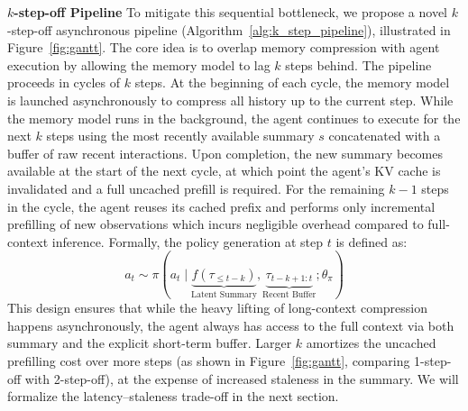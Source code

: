 \noindent \textbf{$k$-step-off Pipeline}
To mitigate this sequential bottleneck, we propose a novel $k$-step-off asynchronous pipeline (Algorithm~\ref{alg:k_step_pipeline}), illustrated in Figure~\ref{fig:gantt}.
The core idea is to overlap memory compression with agent execution by allowing the memory model to lag $k$ steps behind.
The pipeline proceeds in cycles of $k$ steps. At the beginning of each cycle, the memory model is launched asynchronously to compress all history up to the current step. While the memory model runs in the background, the agent continues to execute for the next $k$ steps using the most recently available summary $s$ concatenated with a buffer of raw recent interactions. Upon completion, the new summary becomes available at the start of the next cycle, at which point the agent's KV cache is invalidated and a full uncached prefill is required.
For the remaining $k-1$ steps in the cycle, the agent reuses its cached prefix and performs only incremental prefilling of new observations which incurs negligible overhead compared to full-context inference.
Formally, the policy generation at step $t$ is defined as:
\begin{equation}
a_t \sim \pi(a_t \mid \underbrace{f(\tau_{\leq t-k})}_{\text{Latent Summary}}, \underbrace{\tau_{t-k+1:t}}_{\text{Recent Buffer}}; \theta_{\pi})
\end{equation}
This design ensures that while the heavy lifting of long-context compression happens asynchronously, the agent always has access to the full context via both summary and the explicit short-term buffer.
Larger $k$ amortizes the uncached prefilling cost over more steps (as shown in Figure~\ref{fig:gantt}, comparing 1-step-off with 2-step-off), at the expense of increased staleness in the summary.
We will formalize the latency--staleness trade-off in the next section.


